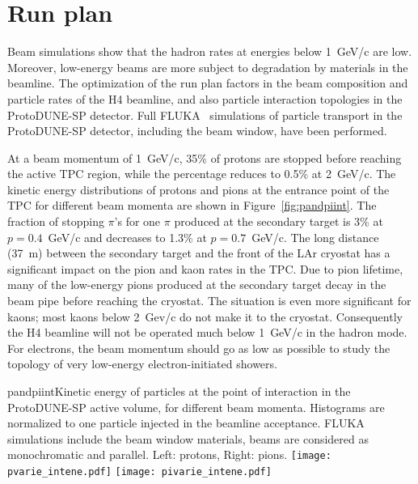 

\section{Run plan}
\label{sec:runplan}


Beam simulations show that the hadron rates at 
energies below 1~GeV/c are low. Moreover, low-energy beams are more
subject to degradation by materials in the
beamline.  The optimization of the run plan factors in the beam composition and particle rates of the H4 beamline, and 
also particle interaction topologies in the ProtoDUNE-SP detector. Full FLUKA~%
simulations of particle transport in the ProtoDUNE-SP detector, including the
beam window, have been performed.


At a beam momentum of 1~GeV/c, 35\% of protons are stopped before reaching the active TPC region, while the percentage reduces to 0.5\% at 2~GeV/c.  The kinetic energy distributions of protons and pions at the entrance point of the TPC for different beam momenta are shown in Figure~\ref{fig:pandpiint}. 
The fraction of stopping $\pi$'s for one $\pi$
produced at the secondary target is 3\% at $p=0.4$~GeV/c and decreases to 1.3\% at $p=0.7$~GeV/c.
The long distance (37~m) between the secondary target and the front of the LAr cryostat has a significant impact on the pion and kaon rates in the TPC. Due to pion lifetime, many of the  low-energy pions produced at the secondary target decay in the beam pipe before reaching the cryostat. The situation is even more significant for kaons; most kaons below 2~Gev/c do not make it to the cryostat.
Consequently the H4 beamline will not be operated much below 1~GeV/c in the hadron mode.
For electrons, %
the beam momentum should go %
as low as possible to study the topology of very low-energy electron-initiated 
showers.
\begin{cdrfigure}{pandpiint}{Kinetic energy of
    particles at the point of interaction in the ProtoDUNE-SP active
    volume, for different beam momenta. Histograms are normalized to one particle injected in the
    beamline acceptance. FLUKA simulations include the beam window
    materials, beams are considered as monochromatic and
    parallel. Left: protons, Right: pions.}
  \texttt{[image: pvarie\_intene.pdf]}
  \texttt{[image: pivarie\_intene.pdf]}
\end{cdrfigure}


